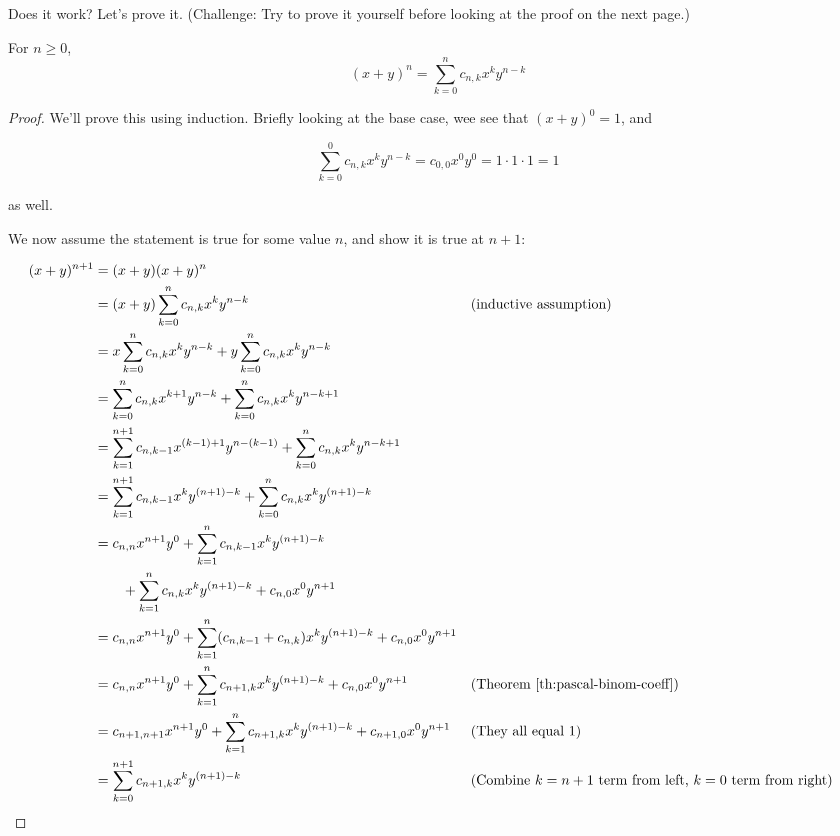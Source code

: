 Does it work? Let's prove it. (Challenge: Try to prove it yourself before looking at the proof on the next page.)

\newpage

\begin{theorem} 
\label{th:binom-expand}
For $n \geq 0$, 
\begin{equation}
(x+y)^n = \sum_{k=0}^n c_{n,k} x^k y^{n-k}
\end{equation} 

\end{theorem}
\begin{proof}
We'll prove this using induction. Briefly looking at the base case, wee see that $(x+y)^0 = 1$, and

\begin{equation*}
\sum_{k=0}^0 c_{n,k} x^k y^{n-k} = c_{0,0} x^0 y^0 = 1 \cdot 1 \cdot 1 = 1
\end{equation*}

as well.

We now assume the statement is true for some value $n$, and show it is true at $n+1$:

\begin{align*}
(x+y)^{n+1} &= (x+y)(x+y)^n \\
&= (x+y) \sum_{k=0}^n c_{n,k} x^k y^{n-k} && \text{(inductive assumption)} \\
&= x \sum_{k=0}^n c_{n,k} x^k y^{n-k} + y \sum_{k=0}^n c_{n,k} x^k y^{n-k} \\
&= \sum_{k=0}^n c_{n,k} x^{k+1} y^{n-k} + \sum_{k=0}^n c_{n,k} x^k y^{n-k+1} \\
&= \sum_{k=1}^{n+1} c_{n,k-1} x^{(k-1)+1} y^{n-(k-1)} + \sum_{k=0}^n c_{n,k} x^k y^{n-k+1} \\
&= \sum_{k=1}^{n+1} c_{n,k-1} x^{k} y^{(n+1)-k} + \sum_{k=0}^n c_{n,k} x^k y^{(n+1)-k} \\
&= c_{n,n} x^{n+1} y^0 + \sum_{k=1}^{n} c_{n,k-1} x^{k} y^{(n+1)-k} \\
&\qquad+ \sum_{k=1}^n c_{n,k} x^k y^{(n+1)-k} + c_{n,0} x^0 y^{n+1} \\
&= c_{n,n} x^{n+1} y^0 + \sum_{k=1}^{n} (c_{n,k-1} + c_{n,k}) x^{k} y^{(n+1)-k} + c_{n,0} x^0 y^{n+1} \\
&= c_{n,n} x^{n+1} y^0 + \sum_{k=1}^{n} c_{n+1,k} x^{k} y^{(n+1)-k} + c_{n,0} x^0 y^{n+1} && \text{(Theorem \ref{th:pascal-binom-coeff})} \\
&= c_{n+1,n+1} x^{n+1} y^0 + \sum_{k=1}^{n} c_{n+1,k} x^{k} y^{(n+1)-k} + c_{n+1,0} x^0 y^{n+1} && \text{(They all equal 1)} \\
&= \sum_{k=0}^{n+1} c_{n+1,k} x^{k} y^{(n+1)-k} && \text{(Combine $k=n+1$ term from left, $k=0$ term from right)} \\
\end{align*}

\end{proof}

